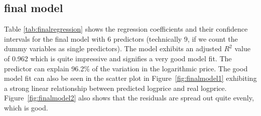 \documentclass[12 pt]{scrartcl}
\begin{document}
\subsection{final model}

Table \ref{tab:finalregression} shows the regression coefficients and their confidence intervals for the final model with 6 predictors (technically 9, if we count the dummy variables as single predictors). The model exhibits an adjusted $R^2$ value of 0.962 which is quite impressive and signifies a very good model fit. The predictor can explain 96.2\% of the variation in the logarithmic price. The good model fit can also be seen in the scatter plot in Figure~\ref{fig:finalmodel1} exhibiting a strong linear relationship between predicted logprice and real logprice. Figure~\ref{fig:finalmodel2} also shows that the residuals are spread out quite evenly, which is good.
\end{document}

